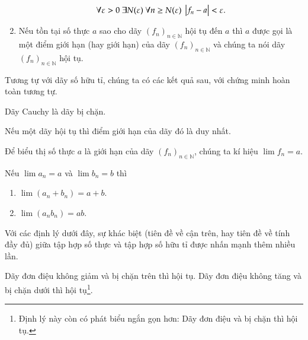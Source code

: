 \begin{definition}
\begin{enumerate}[label={(\roman*)}]
              \[
                  \forall \varepsilon > 0\ \exists N(\varepsilon)\ \forall n\geq N(\varepsilon)\ \left\vert{f_{n} - a}\right\vert < \varepsilon.
              \]
        \item Nếu tồn tại số thực $a$ sao cho dãy ${(f_{n})}_{n\in\mathbb{N}}$ hội tụ đến $a$ thì $a$ được gọi là một điểm giới hạn (hay giới hạn) của  dãy ${(f_{n})}_{n\in\mathbb{N}}$ và chúng ta nói dãy ${(f_{n})}_{n\in\mathbb{N}}$ hội tụ.
    \end{enumerate}
\end{definition}

Tương tự với dãy số hữu tỉ, chúng ta có các kết quả sau, với chứng minh hoàn toàn tương tự.
\begin{appendixthm}
    Dãy Cauchy là dãy bị chặn.
\end{appendixthm}

\begin{appendixthm}
    Nếu một dãy hội tụ thì điểm giới hạn của dãy đó là duy nhất.
\end{appendixthm}

Để biểu thị số thực $a$ là giới hạn của dãy ${(f_{n})}_{n\in\mathbb{N}}$, chúng ta kí hiệu $\lim f_{n} = a$.

\begin{appendixthm}\label{appendixthm:limits-of-sum-and-product-of-sequences}
    Nếu $\lim a_{n} = a$ và $\lim b_{n} = b$ thì
    \begin{enumerate}[label={(\roman*)}]
        \item $\lim (a_{n} + b_{n}) = a + b$.
        \item $\lim (a_{n}b_{n}) = ab$.
    \end{enumerate}
\end{appendixthm}

Với các định lý dưới đây, sự khác biệt (tiên đề về cận trên, hay tiên đề về tính đầy đủ) giữa tập hợp số thực và tập hợp số hữu tỉ được nhấn mạnh thêm nhiều lần.

\begin{appendixthm}
    Dãy đơn điệu không giảm và bị chặn trên thì hội tụ. Dãy đơn điệu không tăng và bị chặn dưới thì hội tụ\footnote{Định lý này còn có phát biểu ngắn gọn hơn: Dãy đơn điệu và bị chặn thì hội tụ.}.
\end{appendixthm}

